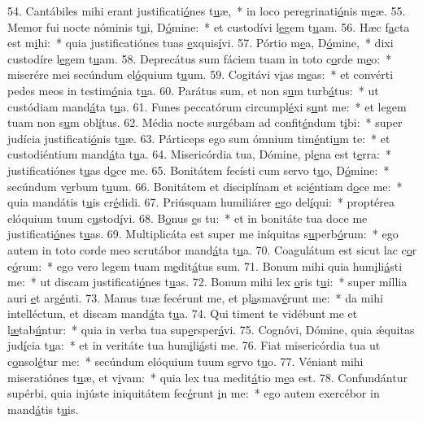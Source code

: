 54. Cantábiles mihi erant justificati\uline{ó}nes t\uline{u}æ,~* in loco peregrinati\uline{ó}nis m\uline{e}æ.
55. Memor fui nocte nóminis t\uline{u}i, D\uline{ó}mine:~* et custodívi l\uline{e}gem t\uline{u}am.
56. Hæc f\uline{a}cta est m\uline{i}hi:~* quia justificatiónes tuas \uline{e}xquis\uline{í}vi.
57. Pórtio m\uline{e}a, D\uline{ó}mine,~* dixi custodíre l\uline{e}gem t\uline{u}am.
58. Deprecátus sum fáciem tuam in toto c\uline{o}rde m\uline{e}o:~* miserére mei secúndum el\uline{ó}quium t\uline{u}um.
59. Cogitávi v\uline{i}as m\uline{e}as:~* et convérti pedes meos in testim\uline{ó}nia t\uline{u}a.
60. Parátus sum, et non s\uline{u}m turb\uline{á}tus:~* ut custódiam mand\uline{á}ta t\uline{u}a.
61. Funes peccatórum circumpl\uline{é}xi s\uline{u}nt me:~* et legem tuam non s\uline{u}m obl\uline{í}tus.
62. Média nocte surgébam ad confit\uline{é}ndum t\uline{i}bi:~* super judícia justificati\uline{ó}nis t\uline{u}æ.
63. Párticeps ego sum ómnium tim\uline{é}nti\uline{u}m te:~* et custodiéntium mand\uline{á}ta t\uline{u}a.
64. Misericórdia tua, Dómine, pl\uline{e}na est t\uline{e}rra:~* justificatiónes t\uline{u}as d\uline{o}ce me.
65. Bonitátem fecísti cum servo t\uline{u}o, D\uline{ó}mine:~* secúndum v\uline{e}rbum t\uline{u}um.
66. Bonitátem et disciplínam et sci\uline{é}ntiam d\uline{o}ce me:~* quia mandátis t\uline{u}is cr\uline{é}didi.
67. Priúsquam humiliárer \uline{e}go del\uline{í}qui:~* proptérea elóquium tuum c\uline{u}stod\uline{í}vi.
68. B\uline{o}nus \uline{e}s tu:~* et in bonitáte tua doce me justificati\uline{ó}nes t\uline{u}as.
69. Multiplicáta est super me iníquitas s\uline{u}perb\uline{ó}rum:~* ego autem in toto corde meo scrutábor mand\uline{á}ta t\uline{u}a.
70. Coagulátum est sicut lac c\uline{o}r e\uline{ó}rum:~* ego vero legem tuam m\uline{e}dit\uline{á}tus sum.
71. Bonum mihi quia hum\uline{i}li\uline{á}sti me:~* ut discam justificati\uline{ó}nes t\uline{u}as.
72. Bonum mihi lex \uline{o}ris t\uline{u}i:~* super míllia auri \uline{e}t arg\uline{é}nti.
73. Manus tuæ fecérunt me, et pl\uline{a}smav\uline{é}runt me:~* da mihi intelléctum, et discam mand\uline{á}ta t\uline{u}a.
74. Qui timent te vidébunt me et l\uline{æ}tab\uline{ú}ntur:~* quia in verba tua sup\uline{e}rsper\uline{á}vi.
75. Cognóvi, Dómine, quia ǽquitas jud\uline{í}cia t\uline{u}a:~* et in veritáte tua hum\uline{i}li\uline{á}sti me.
76. Fiat misericórdia tua ut c\uline{o}nsol\uline{é}tur me:~* secúndum elóquium tuum s\uline{e}rvo t\uline{u}o.
77. Véniant mihi miseratiónes t\uline{u}æ, et v\uline{i}vam:~* quia lex tua medit\uline{á}tio m\uline{e}a est.
78. Confundántur supérbi, quia injúste iniquitátem fec\uline{é}runt \uline{i}n me:~* ego autem exercébor in mand\uline{á}tis t\uline{u}is.
